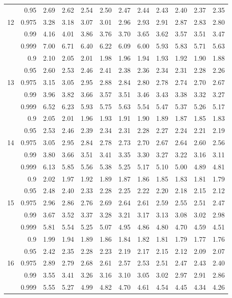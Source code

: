 \documentclass[12pt,a4paper,openany,twoside]{report}
\theoremstyle{definition}
\theoremstyle{remark}
\theoremstyle{plain}
\theoremstyle{definition}
\theoremstyle{definition}
\theoremstyle{definition}
\theoremstyle{remark}
\begin{document}
\begin{center}
\begin{tabular}{rr@{\ \ }r@{\ \ }r@{\ \ }r@{\ \ }r@{\ \ }r@{\ \ }r@{\ \ }r@{\ \ }r@{\ \ }r@{\ \ }r@{ }}
 & 0.95 & 2.69 & 2.62 & 2.54 & 2.50 & 2.47 & 2.44 & 2.43 & 2.40 & 2.37 & 2.35\\
12 & 0.975 & 3.28 & 3.18 & 3.07 & 3.01 & 2.96 & 2.93 & 2.91 & 2.87 & 2.83 & 2.80\\
 & 0.99 & 4.16 & 4.01 & 3.86 & 3.76 & 3.70 & 3.65 & 3.62 & 3.57 & 3.51 & 3.47\\
 & 0.999 & 7.00 & 6.71 & 6.40 & 6.22 & 6.09 & 6.00 & 5.93 & 5.83 & 5.71 & 5.63\\
\rule{0pt}{2.5ex} & 0.9 & 2.10 & 2.05 & 2.01 & 1.98 & 1.96 & 1.94 & 1.93 & 1.92 & 1.90 & 1.88\\
 & 0.95 & 2.60 & 2.53 & 2.46 & 2.41 & 2.38 & 2.36 & 2.34 & 2.31 & 2.28 & 2.26\\
13 & 0.975 & 3.15 & 3.05 & 2.95 & 2.88 & 2.84 & 2.80 & 2.78 & 2.74 & 2.70 & 2.67\\
 & 0.99 & 3.96 & 3.82 & 3.66 & 3.57 & 3.51 & 3.46 & 3.43 & 3.38 & 3.32 & 3.27\\
 & 0.999 & 6.52 & 6.23 & 5.93 & 5.75 & 5.63 & 5.54 & 5.47 & 5.37 & 5.26 & 5.17\\
\rule{0pt}{2.5ex} & 0.9 & 2.05 & 2.01 & 1.96 & 1.93 & 1.91 & 1.90 & 1.89 & 1.87 & 1.85 & 1.83\\
 & 0.95 & 2.53 & 2.46 & 2.39 & 2.34 & 2.31 & 2.28 & 2.27 & 2.24 & 2.21 & 2.19\\
14 & 0.975 & 3.05 & 2.95 & 2.84 & 2.78 & 2.73 & 2.70 & 2.67 & 2.64 & 2.60 & 2.56\\
 & 0.99 & 3.80 & 3.66 & 3.51 & 3.41 & 3.35 & 3.30 & 3.27 & 3.22 & 3.16 & 3.11\\
 & 0.999 & 6.13 & 5.85 & 5.56 & 5.38 & 5.25 & 5.17 & 5.10 & 5.00 & 4.89 & 4.81\\
\rule{0pt}{2.5ex} & 0.9 & 2.02 & 1.97 & 1.92 & 1.89 & 1.87 & 1.86 & 1.85 & 1.83 & 1.81 & 1.79\\
 & 0.95 & 2.48 & 2.40 & 2.33 & 2.28 & 2.25 & 2.22 & 2.20 & 2.18 & 2.15 & 2.12\\
15 & 0.975 & 2.96 & 2.86 & 2.76 & 2.69 & 2.64 & 2.61 & 2.59 & 2.55 & 2.51 & 2.47\\
 & 0.99 & 3.67 & 3.52 & 3.37 & 3.28 & 3.21 & 3.17 & 3.13 & 3.08 & 3.02 & 2.98\\
 & 0.999 & 5.81 & 5.54 & 5.25 & 5.07 & 4.95 & 4.86 & 4.80 & 4.70 & 4.59 & 4.51\\
\rule{0pt}{2.5ex} & 0.9 & 1.99 & 1.94 & 1.89 & 1.86 & 1.84 & 1.82 & 1.81 & 1.79 & 1.77 & 1.76\\
 & 0.95 & 2.42 & 2.35 & 2.28 & 2.23 & 2.19 & 2.17 & 2.15 & 2.12 & 2.09 & 2.07\\
16 & 0.975 & 2.89 & 2.79 & 2.68 & 2.61 & 2.57 & 2.53 & 2.51 & 2.47 & 2.43 & 2.40\\
 & 0.99 & 3.55 & 3.41 & 3.26 & 3.16 & 3.10 & 3.05 & 3.02 & 2.97 & 2.91 & 2.86\\
 & 0.999 & 5.55 & 5.27 & 4.99 & 4.82 & 4.70 & 4.61 & 4.54 & 4.45 & 4.34 & 4.26\\
\end{tabular}
\end{center}
\end{document}
